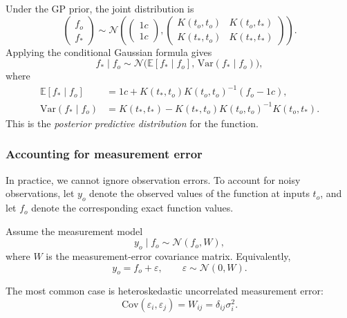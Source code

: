 \documentclass[11pt, titlepage]{article} %
\numberwithin{equation}{section}
\theoremstyle{definition}
\numberwithin{assumption}{section}
\begin{document}
Under the GP prior, the joint distribution is
\begin{equation*}
    \begin{pmatrix}
        f_o\\
        f_*
    \end{pmatrix}
    \sim
    \mathcal{N}\!\left(
    \begin{pmatrix}
        1c\\
        1c
    \end{pmatrix},
    \begin{pmatrix}
        K(t_o,t_o) & K(t_o,t_*)\\
        K(t_*,t_o) & K(t_*,t_*)
    \end{pmatrix}
    \right).
\end{equation*}
Applying the conditional Gaussian formula gives
\begin{equation*}
    f_*\mid f_o \sim \mathcal{N}\!\bigl(\mathbb{E}[f_*\mid f_o],\,\mathrm{Var}(f_*\mid f_o)\bigr),
\end{equation*}
where
\begin{align*}
    \mathbb{E}[f_*\mid f_o]
    &=
    1c+K(t_*,t_o)K(t_o,t_o)^{-1}(f_o-1c),\\
    \mathrm{Var}(f_*\mid f_o)
    &=
    K(t_*,t_*)-K(t_*,t_o)K(t_o,t_o)^{-1}K(t_o,t_*).
\end{align*}
This is the \textit{posterior predictive distribution} for the function.

\subsubsection*{Accounting for measurement error}

In practice, we cannot ignore observation errors. 
To account for noisy observations, let $y_o$
denote the observed values of the function at inputs $t_o$, and let $f_o$
denote the corresponding exact function values.

Assume the measurement model
\begin{equation*}
    y_o\mid f_o \sim \mathcal{N}(f_o,W),
\end{equation*}
where $W$ is the measurement-error covariance matrix. Equivalently,
\begin{equation*}
    y_o=f_o+\varepsilon,
    \qquad
    \varepsilon\sim \mathcal{N}(0,W).
\end{equation*}

The most common case is heteroskedastic uncorrelated measurement error:
\begin{equation*}
    \mathrm{Cov}(\varepsilon_i,\varepsilon_j)=W_{ij}=\delta_{ij}\sigma_i^2.
\end{equation*}
\end{document}
